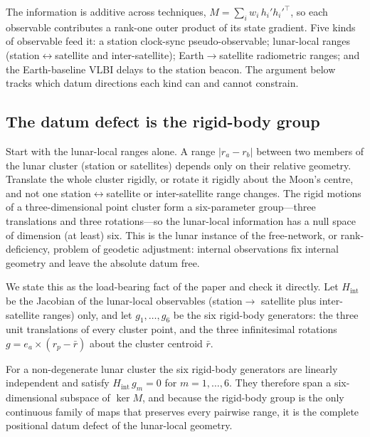 The information is additive across techniques, $M = \sum_i w_i\, h_i' h_i'^{\top}$,
so each observable contributes a rank-one outer product of its state gradient. Five
kinds of observable feed it: a station clock-sync pseudo-observable; lunar-local
ranges (station$\leftrightarrow$satellite and inter-satellite); Earth$\to$satellite
radiometric ranges; and the Earth-baseline VLBI delays to the station beacon. The
argument below tracks which datum directions each kind can and cannot constrain.

\subsection{The datum defect is the rigid-body group}

Start with the lunar-local ranges alone. A range $\lvert r_a - r_b\rvert$ between
two members of the lunar cluster (station or satellites) depends only on their
relative geometry. Translate the whole cluster rigidly, or rotate it rigidly about
the Moon's centre, and not one station$\leftrightarrow$satellite or inter-satellite
range changes. The rigid motions of a three-dimensional point cluster form a
six-parameter group---three translations and three rotations---so the lunar-local
information has a null space of dimension (at least) six. This is the lunar
instance of the free-network, or rank-deficiency, problem of geodetic adjustment:
internal observations fix internal geometry and leave the absolute datum free.

We state this as the load-bearing fact of the paper and check it directly. Let
$H_{\mathrm{int}}$ be the Jacobian of the lunar-local observables (station$\to$%
satellite plus inter-satellite ranges) only, and let
$g_1,\dots,g_6$ be the six rigid-body generators: the three unit translations of
every cluster point, and the three infinitesimal rotations $g = e_a \times (r_p -
\bar r)$ about the cluster centroid $\bar r$.

\begin{theorem}
\label{thm:rigid}
For a non-degenerate lunar cluster the six rigid-body generators are linearly
independent and satisfy $H_{\mathrm{int}}\, g_m = 0$ for $m = 1,\dots,6$. They
therefore span a six-dimensional subspace of $\ker M$, and because the rigid-body
group is the only continuous family of maps that preserves every pairwise range,
it is the complete positional datum defect of the lunar-local geometry.
\end{theorem}

